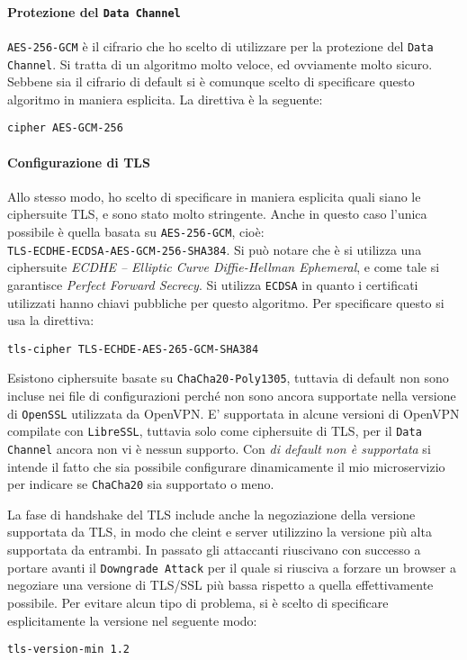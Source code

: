\paragraph{Protezione del \texttt{Data Channel}}
\texttt{AES-256-GCM} è il cifrario che ho scelto di utilizzare per la protezione
del \texttt{Data Channel}. Si tratta di un algoritmo molto veloce, ed ovviamente
molto sicuro.
Sebbene sia il cifrario di default si è comunque scelto di specificare questo algoritmo in
maniera esplicita. La direttiva è la seguente:
\begin{verbatim}
cipher AES-GCM-256
\end{verbatim}

\paragraph{Configurazione di TLS}
Allo stesso modo, ho scelto di specificare in maniera esplicita quali siano
le ciphersuite TLS, e sono stato molto stringente. Anche in questo caso
l'unica possibile è quella basata su \texttt{AES-256-GCM}, cioè:\\
\texttt{TLS-ECDHE-ECDSA-AES-GCM-256-SHA384}.
Si può notare che è si utilizza una ciphersuite
\textit{ECDHE -- Elliptic Curve Diffie-Hellman Ephemeral}, e come tale si garantisce
\textit{Perfect Forward Secrecy}. Si utilizza \texttt{ECDSA} in quanto i certificati
utilizzati hanno chiavi pubbliche per questo algoritmo.
Per specificare questo si usa la direttiva:
\begin{verbatim}
tls-cipher TLS-ECHDE-AES-265-GCM-SHA384
\end{verbatim}
Esistono ciphersuite basate su \texttt{ChaCha20-Poly1305}, tuttavia di default non
sono incluse nei file di configurazioni perché non sono ancora supportate nella
versione di \texttt{OpenSSL} utilizzata da OpenVPN. E' supportata in alcune versioni
di OpenVPN compilate con \texttt{LibreSSL}, tuttavia solo come ciphersuite di TLS,
per il \texttt{Data Channel} ancora non vi è nessun supporto. Con \textit{di default
non è supportata} si intende il fatto che sia possibile configurare dinamicamente
il mio microservizio per indicare se \texttt{ChaCha20} sia supportato o meno.

La fase di handshake del TLS include anche la negoziazione della versione supportata
da TLS, in modo che cleint e server utilizzino la versione più alta supportata da entrambi.
In passato gli attaccanti riuscivano con successo a portare avanti il \texttt{Downgrade Attack}
per il quale si riusciva a forzare un browser a negoziare una versione di TLS/SSL
più bassa rispetto a quella effettivamente possibile. Per evitare alcun tipo
di problema, si è scelto di specificare esplicitamente la versione nel seguente modo:
\begin{verbatim}
tls-version-min 1.2
\end{verbatim}

